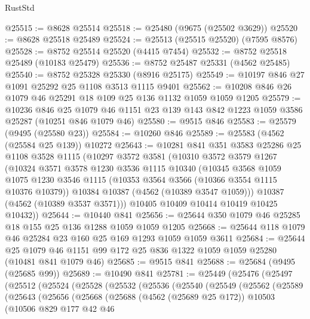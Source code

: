\begin{lexlean}{RustStd}
\begin{coremodule}
@25515 := @8628 @25514
@25518 := @25480 (@9675 (@25502 @3629))
@25520 := @8628 @25518 @25489
@25524 := @25513 (@25515 @25520) (@7595 @8576)
@25528 := @8752 @25514 @25520 (@4415 @7454)
@25532 := @8752 @25518 @25489 (@10183 @25479)
@25536 := @8752 @25487 @25331 (@4562 @25485)
@25540 := @8752 @25328 @25330 (@8916 @25175)
@25549 := @10197 @846 @27 @1091 @25292 @25 @1108 @3513 @1115 @9401
@25562 := @10208 @846 @26 @1079 @46 @25291 @18 @109 @25 @136 @1132 @1059 @1059 @1205
@25579 := @10236
    @846
    @25
    @1079
    @46
    @1151
    @23
    @139
    @143
    @842
    @1223
    @1059
    @3586
    @25287
    (@10251 @846 @1079 @46)
@25580 := @9515 @846
@25583 := @25579 (@9495 (@25580 @23))
@25584 := @10260 @846
@25589 := @25583 (@4562 (@25584 @25 @139)) @10272
@25643 := @10281
    @841
    @351
    @3583
    @25286
    @25
    @1108
    @3528
    @1115
    (@10297
      @3572
      @3581
      (@10310
        @3572
        @3579
        @1267
        (@10324
          @3571
          @3578
          @1230
          @3536
          @1115
          @10340
          (@10345
            @3568
            @1059
            @1075
            @1230
            @3546
            @1115
            (@10353 @3564 @3566 (@10366 @3554 @1115 @10376 @10379))
            @10384
            @10387
            (@4562 (@10389 @3547 @1059)))
          @10387
          (@4562 (@10389 @3537 @3571)))
        @10405
        @10409
        @10414
        @10419
        @10425
        @10432))
@25644 := @10440 @841
@25656 := @25644 @350 @1079 @46 @25285 @18 @155 @25 @136 @1288 @1059 @1059 @1205
@25668 := @25644 @118 @1079 @46 @25284 @23 @160 @25 @169 @1293 @1059 @1059 @3611
@25684 := @25644
    @25
    @1079
    @46
    @1151
    @99
    @172
    @25
    @836
    @1322
    @1059
    @1059
    @25280
    (@10481 @841 @1079 @46)
@25685 := @9515 @841
@25688 := @25684 (@9495 (@25685 @99))
@25689 := @10490 @841
@25781 := @25449
    (@25476
      (@25497
        (@25512
          (@25524
            (@25528
              (@25532
                (@25536
                  (@25540
                    (@25549
                      (@25562
                        (@25589
                          (@25643
                            (@25656
                              (@25668
                                (@25688
                                  (@4562 (@25689 @25 @172))
                                  @10503
                                  (@10506
                                    @829
                                    @177
                                    @42
                                    @46

\end{coremodule}
\end{lexlean}
